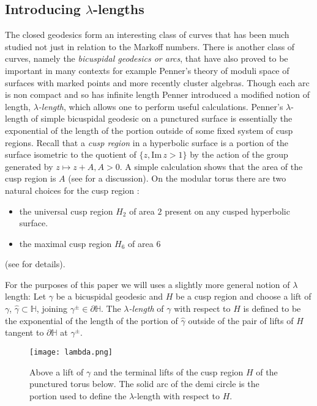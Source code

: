 \documentclass[12pt,a4paper]{amsart}
\def\HH{\mathbb{H}}
\def\im{\mathrm{Im}\,}
\begin{document}
\subsection{Introducing $\lambda$-lengths}


The closed geodesics form an interesting class of curves that has been much
studied not just in relation to the Markoff numbers. There is another class of
curves, namely the \textit{bicuspidal geodesics or arcs}, that have also proved
to be important in many contexts for example Penner's theory of moduli space of
surfaces with marked points and more recently cluster algebras. Though each arc
is non compact and so has infinite length Penner \cite{bob} introduced a
modified notion of length, \textit{$\lambda$-length}, which allows one to
perform useful calculations.  Penner's $\lambda$-length of simple bicuspidal
geodesic on a punctured surface is essentially the exponential of  the length
of the portion outside of some fixed system of cusp regions. Recall that a
\textit{cusp region} in a hyperbolic surface is a portion of the surface
isometric to  the quotient of $\{ z, \im z > 1\}$ by the action of the group
generated by $z \mapsto z + A, A > 0$. A simple calculation shows that the area
of the cusp region is $A$ (see \cite{thesis} for a discussion). On the modular
torus there are two natural choices for the cusp region :

\begin{itemize}
\item the universal cusp region $H_2$  of area $2$ present on any cusped hyperbolic surface.
\item the  maximal cusp region $H_6$ of area $6$ 
\end{itemize}
(see \cite{thesis} for details).

For the purposes of this paper we will uses a slightly more general notion of
$\lambda$ length: Let $\gamma$ be a bicuspidal geodesic and $H$ be a cusp
region and choose a lift of  
$\gamma$, $\hat{\gamma}\subset \HH$,
joining $\gamma^\pm \in \partial \HH$.
The \textit{$\lambda$-length} of $\gamma$ with respect to $H$ is
defined to be the exponential of the length of the portion of $\hat{\gamma}$ 
outside of the pair of lifts of $H$ tangent to $\partial \HH$ at $\gamma^\pm$.

\begin{figure}[ht]
\begin{center}
\texttt{[image: lambda.png]}
\end{center}
\caption{Above a lift of $\gamma$ and the terminal lifts of the cusp region $H$ of the punctured torus below.
The solid arc of the demi circle is the portion used to define the $\lambda$-length  with respect to $H$.}
	\label{fig:lambda length}
\end{figure}
\end{document}
